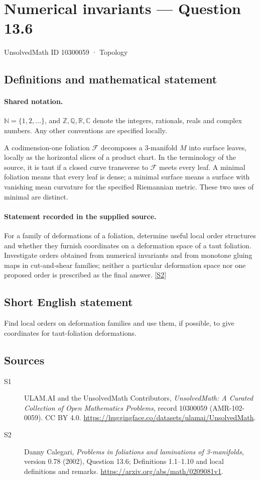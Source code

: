 \documentclass[11pt]{article}
\newcommand{\sref}[2]{\hyperlink{source:#1:#2}{[S#2]}}
\begin{document}
\setcounter{section}{10300058}
\section{Numerical invariants — Question 13.6}\label{10300059}
{\small\sffamily UnsolvedMath ID 10300059 · Topology}
\subsection{Definitions and mathematical statement}

\paragraph{Shared notation.}$\mathbb N=\{1,2,\ldots\}$, and $\mathbb Z,\mathbb Q,\mathbb R,\mathbb C$ denote the integers, rationals, reals and complex numbers. Any other conventions are specified locally.


A codimension-one foliation $\mathcal F$ decomposes a $3$-manifold $M$ into surface leaves, locally as the horizontal slices of a product chart. In the terminology of the source, it is taut if a closed curve transverse to $\mathcal F$ meets every leaf. A minimal foliation means that every leaf is dense; a minimal surface means a surface with vanishing mean curvature for the specified Riemannian metric. These two uses of minimal are distinct.
\paragraph{Statement recorded in the supplied source.}
For a family of deformations of a foliation, determine useful local order structures and whether they furnish coordinates on a deformation space of a taut foliation. Investigate orders obtained from numerical invariants and from monotone gluing maps in cut-and-shear families; neither a particular deformation space nor one proposed order is prescribed as the final answer. \sref{10300059}{2}
\subsection{Short English statement}
Find local orders on deformation families and use them, if possible, to give coordinates for taut-foliation deformations.
\subsection{Sources}
\begin{description}
\item[\hypertarget{source:10300059:1}{S1}] ULAM.AI and the UnsolvedMath Contributors, \emph{UnsolvedMath: A Curated Collection of Open Mathematics Problems}, record 10300059 (AMR-102-0059). CC BY 4.0. \url{https://huggingface.co/datasets/ulamai/UnsolvedMath}.
\item[\hypertarget{source:10300059:2}{S2}] Danny Calegari, \emph{Problems in foliations and laminations of 3-manifolds}, version 0.78 (2002), Question 13.6; Definitions 1.1--1.10 and local definitions and remarks. \url{https://arxiv.org/abs/math/0209081v1}.
\end{description}
\label{end:10300059}
\end{document}
